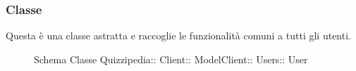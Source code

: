 \subsubsection{Classe }
Questa è una classe astratta e raccoglie le funzionalità comuni a tutti gli utenti.
\begin{figure}[H]
\centering
\noindent{}
\caption[Schema Classe User]{Schema Classe Quizzipedia:: Client:: ModelClient:: Users:: User}
\end{figure}

